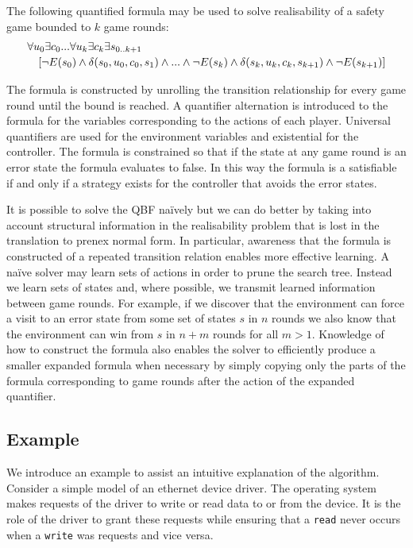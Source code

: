 The following quantified formula may be used to solve realisability of a safety game bounded to $k$ game rounds: 
\begin{equation*}
    \begin{multlined}
        \forall u_0 \exists c_0 ... \forall u_k \exists c_k \exists s_{0..k+1} \\
        \shoveright{[\lnot E(s_0) \land \delta(s_0, u_0, c_0, s_1) \land ... \land \lnot E(s_k) \land \delta(s_k, u_k, c_k, s_{k+1}) \land \lnot E(s_{k+1})]}
    \end{multlined}
\end{equation*}

The formula is constructed by unrolling the transition relationship for every game round until the bound is reached. A quantifier alternation is introduced to the formula for the variables corresponding to the actions of each player. Universal quantifiers are used for the environment variables and existential for the controller. The formula is constrained so that if the state at any game round is an error state the formula evaluates to false. In this way the formula is a satisfiable if and only if a strategy exists for the controller that avoids the error states.

It is possible to solve the QBF na\"ively but we can do better by taking into account structural information in the realisability problem that is lost in the translation to prenex normal form. In particular, awareness that the formula is constructed of a repeated transition relation enables more effective learning. A na\"ive solver may learn sets of actions in order to prune the search tree. Instead we learn sets of states and, where possible, we transmit learned information between game rounds. For example, if we discover that the environment can force a visit to an error state from some set of states $s$ in $n$ rounds we also know that the environment can win from $s$ in $n+m$ rounds for all $m > 1$. Knowledge of how to construct the formula also enables the solver to efficiently produce a smaller expanded formula when necessary by simply copying only the parts of the formula corresponding to game rounds after the action of the expanded quantifier.

\subsection{Example}

We introduce an example to assist an intuitive explanation of the algorithm. Consider a simple model of an ethernet device driver. The operating system makes requests of the driver to write or read data to or from the device. It is the role of the driver to grant these requests while ensuring that a \texttt{read} never occurs when a \texttt{write} was requests and vice versa.

